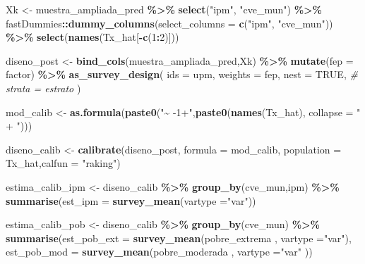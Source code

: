 \documentclass[
  12pt,
]{book}
\newenvironment{Shaded}{\begin{snugshade}}{\end{snugshade}}
\newcommand{\AttributeTok}[1]{\textcolor[rgb]{0.13,0.29,0.53}{#1}}
\newcommand{\CommentTok}[1]{\textcolor[rgb]{0.56,0.35,0.01}{\textit{#1}}}
\newcommand{\ConstantTok}[1]{\textcolor[rgb]{0.56,0.35,0.01}{#1}}
\newcommand{\DecValTok}[1]{\textcolor[rgb]{0.00,0.00,0.81}{#1}}
\newcommand{\FunctionTok}[1]{\textcolor[rgb]{0.13,0.29,0.53}{\textbf{#1}}}
\newcommand{\NormalTok}[1]{#1}
\newcommand{\OtherTok}[1]{\textcolor[rgb]{0.56,0.35,0.01}{#1}}
\newcommand{\SpecialCharTok}[1]{\textcolor[rgb]{0.81,0.36,0.00}{\textbf{#1}}}
\newcommand{\StringTok}[1]{\textcolor[rgb]{0.31,0.60,0.02}{#1}}
\begin{document}
\begin{Shaded}
\begin{Highlighting}[]
\NormalTok{  Xk }\OtherTok{\textless{}{-}}\NormalTok{ muestra\_ampliada\_pred }\SpecialCharTok{\%\textgreater{}\%} \FunctionTok{select}\NormalTok{(}\StringTok{"ipm"}\NormalTok{, }\StringTok{"cve\_mun"}\NormalTok{) }\SpecialCharTok{\%\textgreater{}\%} 
\NormalTok{    fastDummies}\SpecialCharTok{::}\FunctionTok{dummy\_columns}\NormalTok{(}\AttributeTok{select\_columns =} \FunctionTok{c}\NormalTok{(}\StringTok{"ipm"}\NormalTok{, }\StringTok{"cve\_mun"}\NormalTok{)) }\SpecialCharTok{\%\textgreater{}\%} 
    \FunctionTok{select}\NormalTok{(}\FunctionTok{names}\NormalTok{(Tx\_hat[}\SpecialCharTok{{-}}\FunctionTok{c}\NormalTok{(}\DecValTok{1}\SpecialCharTok{:}\DecValTok{2}\NormalTok{)]))}

\NormalTok{  diseno\_post }\OtherTok{\textless{}{-}} \FunctionTok{bind\_cols}\NormalTok{(muestra\_ampliada\_pred,Xk) }\SpecialCharTok{\%\textgreater{}\%} 
    \FunctionTok{mutate}\NormalTok{(}\AttributeTok{fep =}\NormalTok{ factor) }\SpecialCharTok{\%\textgreater{}\%}
    \FunctionTok{as\_survey\_design}\NormalTok{(}
      \AttributeTok{ids =}\NormalTok{ upm,}
      \AttributeTok{weights =}\NormalTok{ fep,}
      \AttributeTok{nest =} \ConstantTok{TRUE}\NormalTok{,}
      \CommentTok{\# strata = estrato}
\NormalTok{    )}

\NormalTok{  mod\_calib }\OtherTok{\textless{}{-}}  \FunctionTok{as.formula}\NormalTok{(}\FunctionTok{paste0}\NormalTok{(}\StringTok{"\textasciitilde{} {-}1+"}\NormalTok{,}\FunctionTok{paste0}\NormalTok{(}\FunctionTok{names}\NormalTok{(Tx\_hat), }\AttributeTok{collapse =} \StringTok{" + "}\NormalTok{)))}

\NormalTok{  diseno\_calib }\OtherTok{\textless{}{-}} \FunctionTok{calibrate}\NormalTok{(diseno\_post, }\AttributeTok{formula =}\NormalTok{ mod\_calib, }
                            \AttributeTok{population =}\NormalTok{ Tx\_hat,}\AttributeTok{calfun =} \StringTok{"raking"}\NormalTok{)}

\NormalTok{  estima\_calib\_ipm  }\OtherTok{\textless{}{-}}\NormalTok{ diseno\_calib }\SpecialCharTok{\%\textgreater{}\%} \FunctionTok{group\_by}\NormalTok{(cve\_mun,ipm) }\SpecialCharTok{\%\textgreater{}\%} 
    \FunctionTok{summarise}\NormalTok{(}\AttributeTok{est\_ipm =} \FunctionTok{survey\_mean}\NormalTok{(}\AttributeTok{vartype =}\StringTok{"var"}\NormalTok{))}

\NormalTok{  estima\_calib\_pob  }\OtherTok{\textless{}{-}}\NormalTok{ diseno\_calib }\SpecialCharTok{\%\textgreater{}\%} \FunctionTok{group\_by}\NormalTok{(cve\_mun) }\SpecialCharTok{\%\textgreater{}\%} 
    \FunctionTok{summarise}\NormalTok{(}\AttributeTok{est\_pob\_ext =} \FunctionTok{survey\_mean}\NormalTok{(pobre\_extrema , }\AttributeTok{vartype =}\StringTok{"var"}\NormalTok{),}
              \AttributeTok{est\_pob\_mod =} \FunctionTok{survey\_mean}\NormalTok{(pobre\_moderada  , }\AttributeTok{vartype =}\StringTok{"var"}\NormalTok{ ))}


\end{Highlighting}
\end{Shaded}
\end{document}
